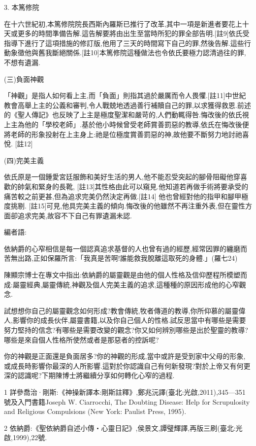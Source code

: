 \documentclass{book}
\begin{document}
3. 本篤修院

在十六世紀初,本篤修院院長西斯內羅斯已推行了改革,其中一項是新進者要花上十天或更多的時間準備告解.這告解要將由出生至當時所犯的罪全部告明.[註9]依氏受指導下進行了這項措施的修訂版,他用了三天的時間寫下自己的罪,然後告解.這些行動象徵他與舊我斷絕關係.[註10]本篤修院這種做法也令依氏要極力認清過往的罪,不想有遺漏.

(三)負面神觀

「神觀」是指人如何看上主,而「負面」則指其過於嚴厲而令人畏懼.[註11]中世紀教會高舉上主的公義和審判,令人戰兢地透過善行補贖自己的罪,以求獲得救恩.前述的《聖人傳記》也反映了上主是極度聖潔和嚴苛的,人們動輒得咎.悔改後的依氏視上主為他的「學校老師」.基於他小時候曾受老師賞善罰惡的教導,依氏在悔改後便將老師的形象投射在上主身上:祂是位極度賞善罰惡的神,故他要不斷努力地討祂喜悅. [註12]

(四)完美主義

依氏原是一個鍾愛宮廷服飾和美好生活的男人,他不能忍受突起的腳骨阻礙他穿喜歡的帥氣和緊身的長靴, [註13]其性格由此可以窺見.他知道若再做手術將要承受的痛苦較之前更甚,但為追求完美仍然決定再做.[註14] 他也曾經對他的指甲和腳甲極度挑剔. [註15]可見,他具完美主義的傾向.悔改後的他雖然不再注重外表,但在靈性方面卻追求完美,故容不下自己有罪遺漏未認.

編者語:

依納爵的心窄相信是每一個認真追求基督的人也曾有過的經歷,經常因罪的纏磨而苦無出路,正如保羅所言:「我真是苦啊!誰能救我脫離這取死的身體.」(羅七24)

陳顯宗博士在專文中指出:依納爵的屬靈觀是由他的個人性格及信仰歷程所模塑而成:屬靈經典,屬靈傳統,神觀及個人完美主義的追求,這種種的原因形成他的心窄觀念.

試想想你自己的屬靈觀念如何形成?教會傳統,牧者傳道的教導,你所仰慕的屬靈偉人,影響你的成長伙伴,屬靈書籍,以及你自己個人的性格.試反思當中有哪些是需要努力堅持的信念?有哪些是需要改變的觀念?你又如何辨別哪些是出於聖靈的教導?哪些是來自個人性格所使然或者是那惡者的控訴呢?

你的神觀是正面還是負面居多?你的神觀的形成,當中或許是受到家中父母的形象,或成長時影響你最深的人所影響.這對於你認識自己有何新發現?對於上帝又有何更深的認識呢?下期陳博士將繼續分享如何轉化心窄的過程.

1 詳參喬治·剛斯:《神操新譯本:剛斯註釋》,鄭兆沅譯(臺北:光啟,2011),345—351號及入門書籍Joseph W. Ciarrocchi, The Doubting Disease: Help for Scrupulosity and Religious Compulsions (New York: Paulist Press, 1995).

2 依納爵:《聖依納爵自述小傳‧心靈日記》,侯景文,譚璧輝譯,再版三刷(臺北:光啟,1999),22號.
\end{document}
